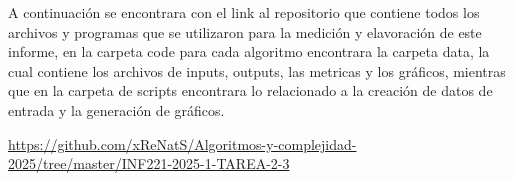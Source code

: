 

A continuación se encontrara con el link al repositorio que contiene todos los archivos y programas que se utilizaron para la medición y elavoración de este informe, en la carpeta code para cada algoritmo encontrara la carpeta data, la cual contiene los archivos de inputs, outputs, las metricas y los gráficos, mientras que en la carpeta de scripts encontrara lo relacionado a la creación de datos de entrada y la generación de gráficos.

\begin{mdframed}
    \begin{center}
        {\Large \url{https://github.com/xReNatS/Algoritmos-y-complejidad-2025/tree/master/INF221-2025-1-TAREA-2-3}}
    \end{center}
\end{mdframed}
